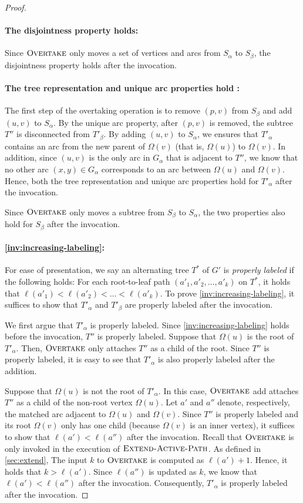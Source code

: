 \documentclass{article}
\newcommand{\alp}{\alpha}
\newcommand{\Omg}{\Omega}
\newcommand{\algExtend}{\textsc{Extend-Active-Path}\xspace}
\newcommand{\algOvertake}{\textsc{Overtake}\xspace}
\begin{document}
\begin{proof}
\paragraph{The disjointness property holds:}
Since $\algOvertake$ only moves a set of vertices and arcs from $S_\alp$ to $S_\beta$, the disjointness property holds after the invocation.

\paragraph{The tree representation and unique arc properties hold :}
The first step of the overtaking operation is to remove $(p, v)$ from $S_\beta$ and add $(u, v)$ to $S_\alp$.
By the unique arc property, after $(p, v)$ is removed, the subtree $T''$ is disconnected from $T'_\beta$.
By adding $(u, v)$ to $S_\alp$, we ensures that $T'_\alp$ contains an arc from the new parent of $\Omg(v)$ (that is, $\Omg(u)$) to $\Omg(v)$.
In addition, since $(u, v)$ is the only arc in $G_\alp$ that is adjacent to $T''$, we know that no other arc $(x, y) \in G_\alp$ corresponds to an arc between $\Omg(u)$ and $\Omg(v)$.
Hence, both the tree representation and unique arc properties hold for $T'_\alp$ after the invocation.

Since $\algOvertake$ only moves a subtree from $S_\beta$ to $S_\alp$, the two properties also hold for $S_\beta$ after the invocation.

\paragraph{\cref{inv:increasing-labeling}:}
For ease of presentation, we say an alternating tree $T^*$ of $G'$ is \emph{properly labeled} if the following holds:
For each root-to-leaf path $(a'_1, a'_2, \dots, a'_k)$ on $T^*$, it holds that $\ell(a'_1) < \ell(a'_2) < \dots < \ell(a'_k)$.
To prove \cref{inv:increasing-labeling}, it suffices to show that $T'_\alp$ and $T'_\beta$ are properly labeled after the invocation.

We first argue that $T'_\alp$ is properly labeled.
Since \cref{inv:increasing-labeling} holds before the invocation, $T''$ is properly labeled.
Suppose that $\Omg(u)$ is the root of $T'_\alp$.
Then, $\algOvertake$ only attaches $T''$ as a child of the root.
Since $T''$ is properly labeled, it is easy to see that $T'_\alp$ is also properly labeled after the addition.

Suppose that $\Omg(u)$ is not the root of $T'_\alp$.
In this case, $\algOvertake$ add attaches $T''$ as a child of the non-root vertex $\Omg(u)$.
Let $a'$ and $a''$ denote, respectively, the matched arc adjacent to $\Omg(u)$ and $\Omg(v)$.
Since $T''$ is properly labeled and its root $\Omg(v)$ only has one child (because $\Omg(v)$ is an inner vertex), it suffices to show that $\ell(a') < \ell(a'')$ after the invocation.
Recall that $\algOvertake$ is only invoked in the execution of $\algExtend$.
As defined in \cref{sec:extend}, The input $k$ to $\algOvertake$ is computed as $\ell(a') + 1$.
Hence, it holds that $k > \ell(a')$.
Since $\ell(a'')$ is updated as $k$, we know that $\ell(a') < \ell(a'')$ after the invocation.
Consequently, $T'_\alp$ is properly labeled after the invocation.


\end{proof}
\end{document}
